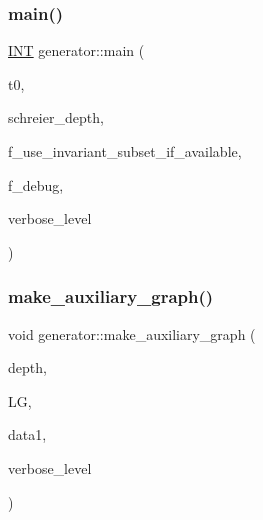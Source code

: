 \mbox{\label{classgenerator_a01abff8e9f231bf0d82e2e8e0061f242}} 
\subsubsection{\texorpdfstring{main()}{main()}}
{\footnotesize\ttfamily \mbox{\hyperlink{galois_8h_a09fddde158a3a20bd2dcadb609de11dc}{I\+NT}} generator\+::main (\begin{DoxyParamCaption}\item[{\mbox{\hyperlink{galois_8h_a09fddde158a3a20bd2dcadb609de11dc}{I\+NT}}}]{t0,  }\item[{\mbox{\hyperlink{galois_8h_a09fddde158a3a20bd2dcadb609de11dc}{I\+NT}}}]{schreier\+\_\+depth,  }\item[{\mbox{\hyperlink{galois_8h_a09fddde158a3a20bd2dcadb609de11dc}{I\+NT}}}]{f\+\_\+use\+\_\+invariant\+\_\+subset\+\_\+if\+\_\+available,  }\item[{\mbox{\hyperlink{galois_8h_a09fddde158a3a20bd2dcadb609de11dc}{I\+NT}}}]{f\+\_\+debug,  }\item[{\mbox{\hyperlink{galois_8h_a09fddde158a3a20bd2dcadb609de11dc}{I\+NT}}}]{verbose\+\_\+level }\end{DoxyParamCaption})}

\mbox{\label{classgenerator_aabd85f45e3975dcf5eb15c0509e58392}} 
\subsubsection{\texorpdfstring{make\+\_\+auxiliary\+\_\+graph()}{make\_auxiliary\_graph()}}
{\footnotesize\ttfamily void generator\+::make\+\_\+auxiliary\+\_\+graph (\begin{DoxyParamCaption}\item[{\mbox{\hyperlink{galois_8h_a09fddde158a3a20bd2dcadb609de11dc}{I\+NT}}}]{depth,  }\item[{\mbox{\hyperlink{classlayered__graph}{layered\+\_\+graph}} $\ast$\&}]{LG,  }\item[{\mbox{\hyperlink{galois_8h_a09fddde158a3a20bd2dcadb609de11dc}{I\+NT}}}]{data1,  }\item[{\mbox{\hyperlink{galois_8h_a09fddde158a3a20bd2dcadb609de11dc}{I\+NT}}}]{verbose\+\_\+level }\end{DoxyParamCaption})}


